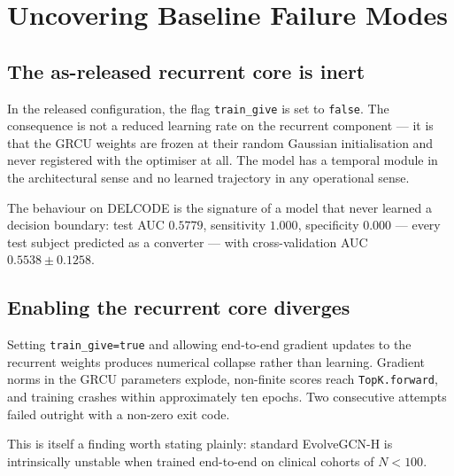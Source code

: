 \section{Uncovering Baseline Failure Modes}
\label{sec:btgt-failures}

\subsection{The as-released recurrent core is inert}

In the released configuration, the flag \texttt{train\_give} is set to \texttt{false}. The
consequence is not a reduced learning rate on the recurrent component --- it is that the
GRCU weights are frozen at their random Gaussian initialisation and never registered with
the optimiser at all. The model has a temporal module in the architectural sense and no
learned trajectory in any operational sense.

The behaviour on DELCODE is the signature of a model that never learned a decision
boundary: test AUC $0.5779$, sensitivity $1.000$, specificity $0.000$ --- every test
subject predicted as a converter --- with cross-validation AUC $0.5538 \pm 0.1258$.


\subsection{Enabling the recurrent core diverges}

Setting \texttt{train\_give=true} and allowing end-to-end gradient updates to the recurrent
weights produces numerical collapse rather than learning. Gradient norms in the GRCU
parameters explode, non-finite scores reach \texttt{TopK.forward}, and training crashes
within approximately ten epochs. Two consecutive attempts failed outright with a non-zero
exit code.

This is itself a finding worth stating plainly: standard EvolveGCN-H is intrinsically
unstable when trained end-to-end on clinical cohorts of $N < 100$.

